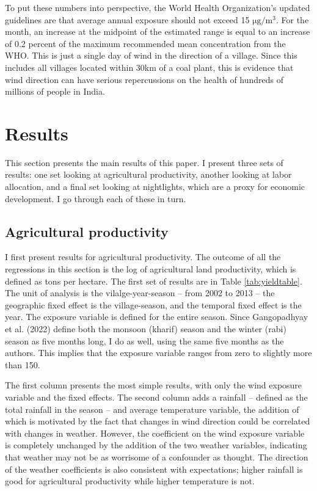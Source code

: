 \documentclass[
]{article}
\begin{document}
To put these numbers into perspective, the World Health Organization's updated guidelines are that average annual exposure should not exceed 15 \(\mathrm{\mu g/m^3}\). For the month, an increase at the midpoint of the estimated range is equal to an increase of 0.2 percent of the maximum recommended mean concentration from the WHO. This is just a single day of wind in the direction of a village. Since this includes all villages located within 30km of a coal plant, this is evidence that wind direction can have serious repercussions on the health of hundreds of millions of people in India.

\hypertarget{results}{%
\section{Results}\label{results}}

\label{results}

This section presents the main results of this paper. I present three sets of results: one set looking at agricultural productivity, another looking at labor allocation, and a final set looking at nightlights, which are a proxy for economic development. I go through each of these in turn.

\hypertarget{agricultural-productivity}{%
\subsection{Agricultural productivity}\label{agricultural-productivity}}

I first present results for agricultural productivity. The outcome of all the regressions in this section is the log of agricultural land productivity, which is defined as tons per hectare. The first set of results are in Table \ref{tab:yieldtable}. The unit of analysis is the vilalge-year-season -- from 2002 to 2013 -- the geographic fixed effect is the village-season, and the temporal fixed effect is the year. The exposure variable is defined for the entire season. Since Gangopadhyay et al. (2022) define both the monsoon (kharif) season and the winter (rabi) season as five months long, I do as well, using the same five months as the authors. This implies that the exposure variable ranges from zero to slightly more than 150.

The first column presents the most simple results, with only the wind exposure variable and the fixed effects. The second column adds a rainfall -- defined as the total rainfall in the season -- and average temperature variable, the addition of which is motivated by the fact that changes in wind direction could be correlated with changes in weather. However, the coefficient on the wind exposure variable is completely unchanged by the addition of the two weather variables, indicating that weather may not be as worrisome of a confounder as thought. The direction of the weather coefficients is also consistent with expectations; higher rainfall is good for agricultural productivity while higher temperature is not.
\end{document}
